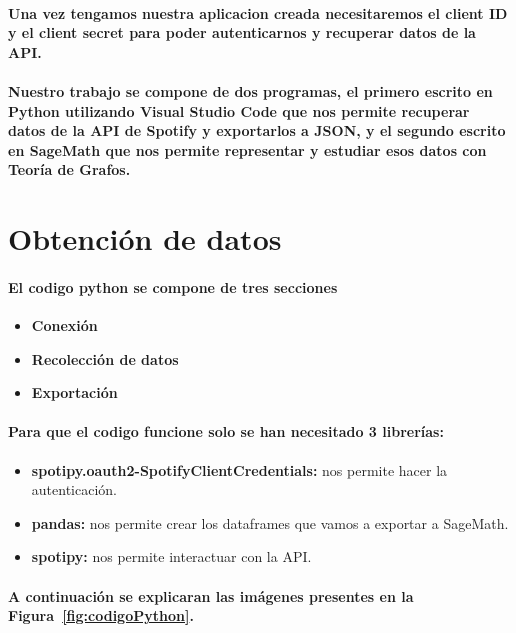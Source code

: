 \documentclass[11pt,spanish]{article}
\begin{document}
\paragraph*{Una vez tengamos nuestra aplicacion creada necesitaremos el client ID y el client secret para poder autenticarnos 
y recuperar datos de la API.}

\paragraph*{Nuestro trabajo se compone de dos programas, el primero escrito en Python utilizando Visual Studio Code
que nos permite recuperar datos de la API de Spotify y exportarlos a JSON, y el segundo escrito en SageMath que nos permite representar y estudiar esos datos con Teoría de Grafos.}

\section{Obtención de datos}

\paragraph*{El codigo python se compone de tres secciones}
\begin{itemize}
	\item \textbf{Conexión}
	\item \textbf{Recolección de datos}
	\item \textbf{Exportación}
\end{itemize}

\paragraph*{Para que el codigo funcione solo se han necesitado 3 librerías:}
\begin{itemize}
	\item \textbf{spotipy.oauth2-SpotifyClientCredentials:} nos permite hacer la autenticación.
	\item \textbf{pandas:} nos permite crear los dataframes que vamos a exportar a SageMath.
	\item \textbf{spotipy:} nos permite interactuar con la API.
\end{itemize}
\paragraph*{A continuación se explicaran las imágenes presentes en la Figura~\ref{fig:codigoPython}.}
\end{document}
